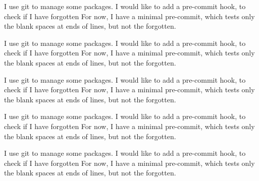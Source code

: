 \documentclass{book}
\begin{document}
\begin{pages}
\begin{Rightside}
\pstart
{}
\pend

\pstart
I use git to manage some packages.
I would like to add a pre-commit hook, to check if I have forgotten
For now, I have a minimal pre-commit, which tests only the blank spaces at ends of lines, but not the forgotten.
\pend

\endnumbering

\end{Rightside}

\end{pages}
\Pages

\begin{pages}
\begin{Leftside}
\beginnumbering
\pstart
{}
\pend

\pstart
I use git to manage some packages.
I would like to add a pre-commit hook, to check if I have forgotten
For now, I have a minimal pre-commit, which tests only the blank spaces at ends of lines, but not the forgotten.
\pend

\pstart
{}
\pend

\pstart
{}
\pend

\pstart
{}
\pend

\pstart
I use git to manage some packages.
I would like to add a pre-commit hook, to check if I have forgotten
For now, I have a minimal pre-commit, which tests only the blank spaces at ends of lines, but not the forgotten.
\pend

\pstart
{}
\pend

\pstart
I use git to manage some packages.
I would like to add a pre-commit hook, to check if I have forgotten
For now, I have a minimal pre-commit, which tests only the blank spaces at ends of lines, but not the forgotten.
\pend


\pstart
I use git to manage some packages.
I would like to add a pre-commit hook, to check if I have forgotten
For now, I have a minimal pre-commit, which tests only the blank spaces at ends of lines, but not the forgotten.
\pend

\pstart
{}
\pend

\pstart
{}
\pend

\pstart
{}
\pend


\end{Leftside}
\end{pages}
\end{document}
